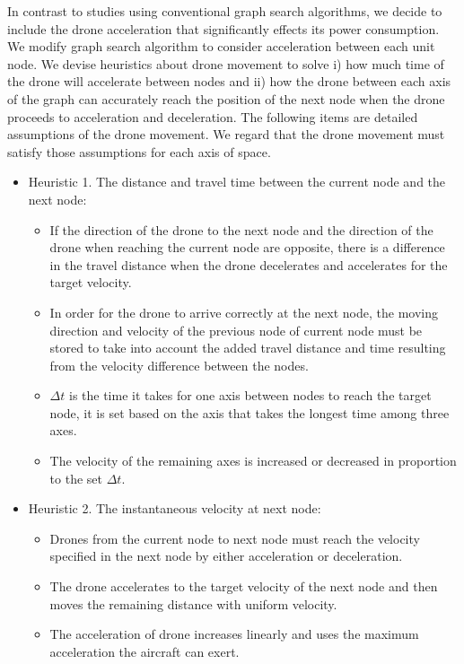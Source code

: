 \documentclass[journal]{./template/IEEEtran}
\begin{document}
In contrast to studies using conventional graph search algorithms, we decide to include the drone acceleration that significantly effects its power consumption. We modify graph search algorithm to consider acceleration between each unit node. 
We devise heuristics about drone movement to solve i) how much time of the drone will accelerate between nodes and ii) how the drone between each axis of the graph can accurately reach the position of the next node when the drone proceeds to acceleration and deceleration. 
The following items are detailed assumptions of the drone movement. 
We regard that the drone movement must satisfy those assumptions for each axis of space.
\begin{itemize}
\item Heuristic 1. The distance and travel time between the current node and the next node:
  \begin{itemize}
      \item If the direction of the drone to the next node and the direction of the drone when reaching the current node are opposite, there is a difference in the travel distance when the drone decelerates and accelerates for the target velocity.
      \item In order for the drone to arrive correctly at the next node, the moving direction and velocity of the previous node of current node must be stored to take into account the added travel distance and time resulting from the velocity difference between the nodes.
      \item $\Delta t$ is the time it takes for one axis between nodes to reach the target node, it is set based on the axis that takes the longest time among three axes.
      \item The velocity of the remaining axes is increased or decreased in proportion to the set $\Delta t$.
  \end{itemize}
\item Heuristic 2. The instantaneous velocity at next node:
  \begin{itemize}
      \item Drones from the current node to next node must reach the velocity specified in the next node by either acceleration or deceleration.
      \item The drone accelerates to the target velocity of the next node and then moves the remaining distance with uniform velocity.
      \item The acceleration of drone increases linearly and uses the maximum acceleration the aircraft can exert. 
  \end{itemize}
\end{itemize}
\end{document}
